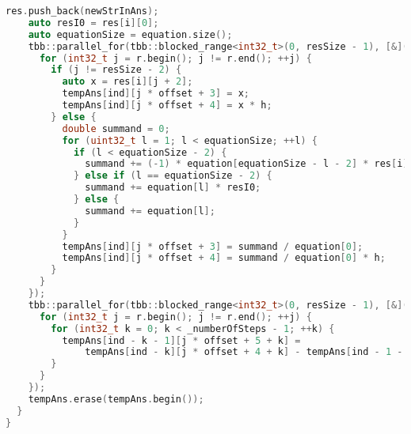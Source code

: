 \documentclass{report}
\begin{document}
\begin{lstlisting}[language=C++,caption=TBB версия]
    res.push_back(newStrInAns);
    auto resI0 = res[i][0];
    auto equationSize = equation.size();
    tbb::parallel_for(tbb::blocked_range<int32_t>(0, resSize - 1), [&](const tbb::blocked_range<int32_t>& r) {
      for (int32_t j = r.begin(); j != r.end(); ++j) {
        if (j != resSize - 2) {
          auto x = res[i][j + 2];
          tempAns[ind][j * offset + 3] = x;
          tempAns[ind][j * offset + 4] = x * h;
        } else {
          double summand = 0;
          for (uint32_t l = 1; l < equationSize; ++l) {
            if (l < equationSize - 2) {
              summand += (-1) * equation[equationSize - l - 2] * res[i][l];
            } else if (l == equationSize - 2) {
              summand += equation[l] * resI0;
            } else {
              summand += equation[l];
            }
          }
          tempAns[ind][j * offset + 3] = summand / equation[0];
          tempAns[ind][j * offset + 4] = summand / equation[0] * h;
        }
      }
    });
    tbb::parallel_for(tbb::blocked_range<int32_t>(0, resSize - 1), [&](const tbb::blocked_range<int32_t>& r) {
      for (int32_t j = r.begin(); j != r.end(); ++j) {
        for (int32_t k = 0; k < _numberOfSteps - 1; ++k) {
          tempAns[ind - k - 1][j * offset + 5 + k] =
              tempAns[ind - k][j * offset + 4 + k] - tempAns[ind - 1 - k][j * offset + 4 + k];
        }
      }
    });
    tempAns.erase(tempAns.begin());
  }
}
\end{lstlisting}

\newpage
\end{document}
